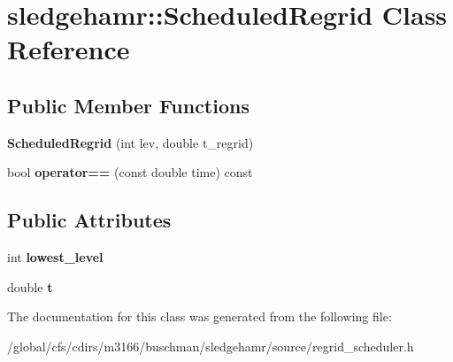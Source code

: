\hypertarget{classsledgehamr_1_1ScheduledRegrid}{}\section{sledgehamr\+:\+:Scheduled\+Regrid Class Reference}
\label{classsledgehamr_1_1ScheduledRegrid}
\subsection*{Public Member Functions}
\begin{DoxyCompactItemize}
\item 
\mbox{\label{classsledgehamr_1_1ScheduledRegrid_a8ad23af8d513b2b07dac6d3faeeb0a5c}} 
{\bfseries Scheduled\+Regrid} (int lev, double t\+\_\+regrid)
\item 
\mbox{\label{classsledgehamr_1_1ScheduledRegrid_a687cc3616f456465240e0c8605ae2bb5}} 
bool {\bfseries operator==} (const double time) const
\end{DoxyCompactItemize}
\subsection*{Public Attributes}
\begin{DoxyCompactItemize}
\item 
\mbox{\label{classsledgehamr_1_1ScheduledRegrid_a1553e76dca9982e2a4be902d2487d85a}} 
int {\bfseries lowest\+\_\+level}
\item 
\mbox{\label{classsledgehamr_1_1ScheduledRegrid_a0ae064ee9de82202c28e786b89687bf5}} 
double {\bfseries t}
\end{DoxyCompactItemize}


The documentation for this class was generated from the following file\+:\begin{DoxyCompactItemize}
\item 
/global/cfs/cdirs/m3166/buschman/sledgehamr/source/regrid\+\_\+scheduler.\+h\end{DoxyCompactItemize}
